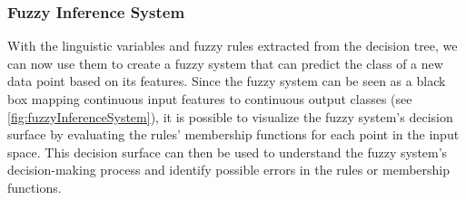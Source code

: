 \subsubsection{Fuzzy Inference System}

With the linguistic variables and fuzzy rules extracted from the decision tree, we can now use them to create a fuzzy system that can predict the class of a new data point based on its features. Since the fuzzy system can be seen as a black box mapping continuous input features to continuous output classes
(see \autoref{fig:fuzzyInferenceSystem}), it is possible to visualize the fuzzy system's decision surface by evaluating the rules' membership functions for each point in the input space. This decision surface can then be used to understand the fuzzy system's decision-making process and identify possible errors in the rules or membership functions.


